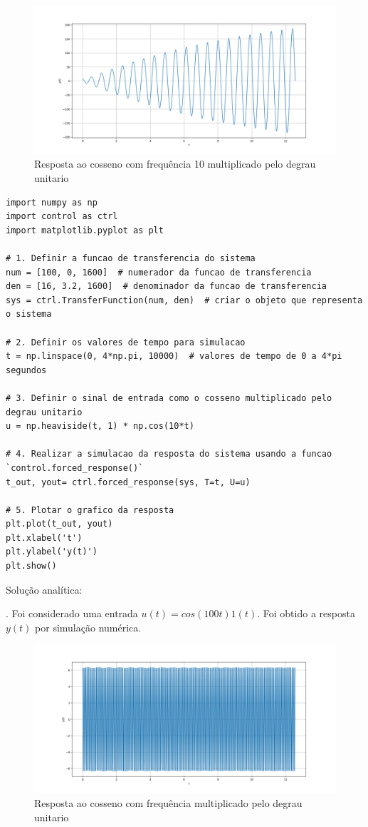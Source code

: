 \documentclass[10pt]{article}
\begin{document}
\begin{figure}[h]
    \centering
    \includegraphics[scale=0.45]{questao3.png}
    \caption{Resposta ao cosseno com frequência 10 multiplicado pelo degrau unitario}
\end{figure}

\begin{lstlisting}
import numpy as np
import control as ctrl
import matplotlib.pyplot as plt

# 1. Definir a funcao de transferencia do sistema
num = [100, 0, 1600]  # numerador da funcao de transferencia
den = [16, 3.2, 1600]  # denominador da funcao de transferencia
sys = ctrl.TransferFunction(num, den)  # criar o objeto que representa o sistema

# 2. Definir os valores de tempo para simulacao
t = np.linspace(0, 4*np.pi, 10000)  # valores de tempo de 0 a 4*pi segundos

# 3. Definir o sinal de entrada como o cosseno multiplicado pelo degrau unitario
u = np.heaviside(t, 1) * np.cos(10*t)

# 4. Realizar a simulacao da resposta do sistema usando a funcao `control.forced_response()`
t_out, yout= ctrl.forced_response(sys, T=t, U=u)

# 5. Plotar o grafico da resposta
plt.plot(t_out, yout)
plt.xlabel('t')
plt.ylabel('y(t)')
plt.show()
\end{lstlisting}

\quad Solução analítica:

\newpage

. Foi considerado uma entrada $u(t) = cos(100 t) 1(t)$. Foi obtido a resposta $y(t)$ por simulação numérica.

\begin{figure}[h]
    \centering
    \includegraphics[scale=0.45]{questao4.png}
    \caption{Resposta ao cosseno com frequência multiplicado pelo degrau unitario}
\end{figure}
\end{document}
